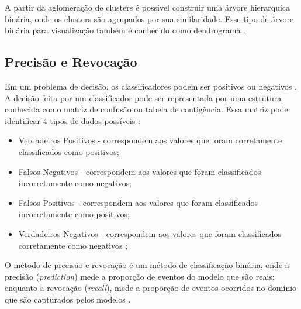 \begin{document}
A partir da aglomeração de clusters é possivel construir uma árvore hierarquica binária, onde os clusters são agrupados por sua similaridade. Esse tipo de árvore binária para visualização também é conhecido como dendrograma \cite{SINGLE_LINKAGE}.


\subsection{Precisão e Revocação} \label{ssec:prec_recall}

Em um problema de decisão, os classificadores podem ser positivos ou negativos \cite{PRECISION_RECALL}. A decisão feita por um classificador pode ser representada por uma estrutura conhecida como matriz de confusão ou tabela de contigência. Essa matriz pode identificar 4 tipos de dados possíveis \cite{PRECISION_RECALL}:

\begin{itemize}
 \item Verdadeiros Positivos - correspondem aos valores que foram corretamente classificados como positivos;
 \item Falsos Negativos - correspondem aos valores que foram classificados incorretamente como negativos;
 \item Falsos Positivos - correspondem aos valores que foram classificados incorretamente como positivos;
 \item Verdadeiros Negativos - correspondem aos valores que foram classificados corretamente como negativos \cite{PRECISION_RECALL};
\end{itemize}

O método de precisão e revocação é um método de classificação binária, onde a precisão (\textit{prediction}) mede a proporção de eventos do modelo que são reais; enquanto a revocação (\textit{recall}), mede a proporção de eventos ocorridos no domínio que são capturados pelos modelos \cite{PREC_RECALL_REGR}. %
\end{document}
